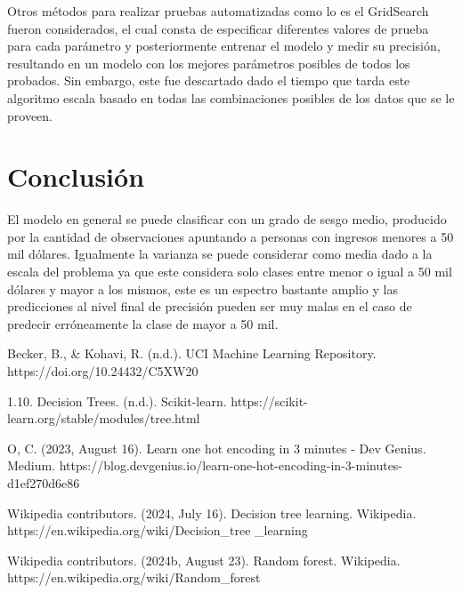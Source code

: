 \documentclass[twocolumn]{article}
\begin{document}
Otros métodos para realizar pruebas automatizadas como lo es el GridSearch fueron 
considerados, el cual consta de especificar diferentes valores de prueba para 
cada parámetro y posteriormente entrenar el modelo y medir su precisión, resultando
en un modelo con los mejores parámetros posibles de todos los probados.
Sin embargo, este fue descartado dado el tiempo que tarda este algoritmo escala 
basado en todas las combinaciones posibles de los datos que se le proveen.

\section{Conclusión}
El modelo en general se puede clasificar con un grado de sesgo medio, producido 
por la cantidad de observaciones apuntando a personas con ingresos menores a 50 mil
dólares. Igualmente la varianza se puede considerar como media dado a la escala
del problema ya que este considera solo clases entre menor o igual a 50 mil dólares 
y mayor a los mismos, este es un espectro bastante amplio y las predicciones al 
nivel final de precisión pueden ser muy malas en el caso de predecir erróneamente
la clase de mayor a 50 mil.

\begin{thebibliography}{9}
Becker, B., \& Kohavi, R. (n.d.). UCI Machine Learning Repository. https://doi.org/10.24432/C5XW20

1.10. Decision Trees. (n.d.). Scikit-learn. https://scikit-learn.org/stable/modules/tree.html


O, C. (2023, August 16). Learn one hot encoding in 3 minutes - Dev Genius. Medium. https://blog.devgenius.io/learn-one-hot-encoding-in-3-minutes-d1ef270d6e86

Wikipedia contributors. (2024, July 16). Decision tree learning. Wikipedia. https://en.wikipedia.org/wiki/Decision\_tree \_learning

Wikipedia contributors. (2024b, August 23). Random forest. Wikipedia. https://en.wikipedia.org/wiki/Random\_forest

\end{thebibliography}
\end{document}
